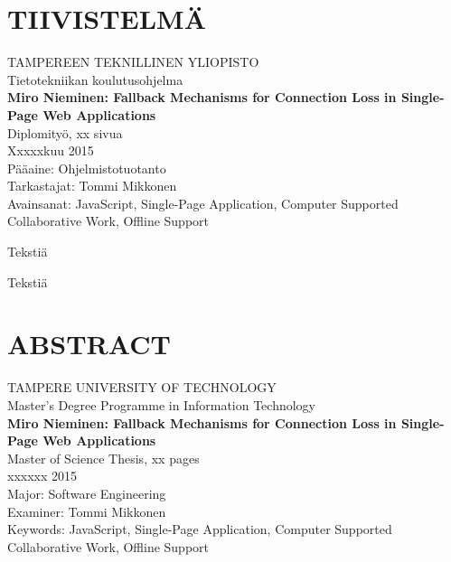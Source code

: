 \newpage
 
\setcounter{page}{1} %
 
\chapter*{TIIVISTELMÄ}
\begin{spacing}{1.0}
\textsf{TAMPEREEN TEKNILLINEN YLIOPISTO}\\
\textsf{Tietotekniikan koulutusohjelma}\\
{\bf \textsf{Miro Nieminen: Fallback Mechanisms for Connection Loss in Single-Page Web Applications}}\\
\textsf{Diplomityö, xx sivua}\\
\textsf{Xxxxxkuu 2015}\\
\textsf{Pääaine: Ohjelmistotuotanto}\\
\textsf{Tarkastajat: Tommi Mikkonen}\\
\textsf{Avainsanat: JavaScript, Single-Page Application, Computer Supported Collaborative Work, Offline Support}\\
\end{spacing}
 
\noindent
Tekstiä
 
\noindent
Tekstiä





\newpage
\chapter*{ABSTRACT}
\begin{spacing}{1.0}
\textsf{TAMPERE UNIVERSITY OF TECHNOLOGY}\\
\textsf{Master's Degree Programme in Information Technology}\\
{\bf \textsf{Miro Nieminen: Fallback Mechanisms for Connection Loss in Single-Page Web Applications}}\\
\textsf{Master of Science Thesis, xx pages}\\
\textsf{xxxxxx 2015}\\
\textsf{Major: Software Engineering}\\
\textsf{Examiner: Tommi Mikkonen}\\
\textsf{Keywords: JavaScript, Single-Page Application, Computer Supported Collaborative Work, Offline Support}\\
\end{spacing}
 
